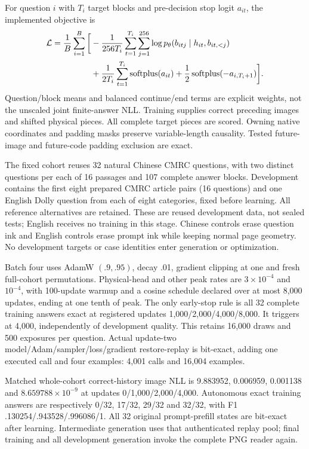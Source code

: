 For question $i$ with $T_i$ target blocks and pre-decision stop logit $a_{it}$,
the implemented objective is
\[
\begin{split}
\mathcal L={1\over B}\sum_{i=1}^{B}\bigg[&
 -{1\over256T_i}\sum_{t=1}^{T_i}\sum_{j=1}^{256}
 \log p_\theta(b_{itj}\mid h_{it},b_{it,<j})\\
 &+{1\over2T_i}\sum_{t=1}^{T_i}\operatorname{softplus}(a_{it})
 +{1\over2}\operatorname{softplus}(-a_{i,T_i+1})\bigg].
\end{split}
\]
Question/block means and balanced continue/end terms are explicit weights,
not the unscaled joint finite-answer NLL. Training supplies correct preceding
images and shifted physical pieces. All complete target pieces are scored.
Owning native coordinates and padding masks preserve variable-length
causality. Tested future-image and future-code padding exclusion are exact.

The fixed cohort reuses 32 natural Chinese CMRC questions, with two distinct
questions per each of 16 passages and 107 complete answer blocks. Development
contains the first eight prepared CMRC article pairs (16 questions) and one
English Dolly question from each of eight categories, fixed before learning.
All reference alternatives are retained. These are reused development data,
not sealed tests; English receives no training in this stage. Chinese controls
erase question ink and English controls erase prompt ink while keeping normal
page geometry. No development targets or case identities enter generation or
optimization.

Batch four uses AdamW $(.9,.95)$, decay .01, gradient clipping at one and
fresh full-cohort permutations. Physical-head and other peak rates are
$3\times10^{-4}$ and $10^{-4}$, with 100-update warmup and a cosine schedule
declared over at most 8,000 updates, ending at one tenth of peak. The only
early-stop rule is all 32 complete training answers exact at registered
updates 1,000/2,000/4,000/8,000. It triggers at 4,000, independently of
development quality. This retains 16,000 draws and 500 exposures per question.
Actual update-two model/Adam/sampler/loss/gradient restore-replay is bit-exact,
adding one executed call and four examples: 4,001 calls and 16,004 examples.

Matched whole-cohort correct-history image NLL is 9.883952, 0.006959,
0.001138 and $8.659788\times10^{-9}$ at updates 0/1,000/2,000/4,000.
Autonomous exact training answers are respectively 0/32, 17/32, 29/32 and
32/32, with F1 .130254/.943528/.996086/1. All 32 original prompt-prefill
states are bit-exact after learning. Intermediate generation uses that
authenticated replay pool; final training and all development generation
invoke the complete PNG reader again.

